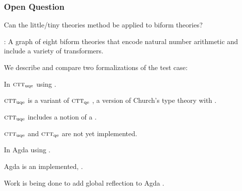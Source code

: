 \documentclass[t,12pt,numbers,fleqn]{beamer}
\newcommand{\churchqe}{$\mbox{\sc ctt}_{\rm qe}$}
\newcommand{\churchuqe}{$\mbox{\sc ctt}_{\rm uqe}$}
\begin{document}

\begin{frame}
\frametitle{Open Question}
\bi

  \item Can the little/tiny theories method be applied to biform
    theories?

  \item {}: A graph of eight biform theories that encode
    natural number arithmetic and include a variety of transformers.

  \item We describe and compare two formalizations of the test case:

  \be

    \item In {\churchuqe} \bbrown{[Far17]} using .

    \bi

      \item {\churchuqe} is a variant of {\churchqe}
        , a version of Church's type theory
        with .

      \item {\churchuqe} includes a notion of a .

      \item {\churchuqe} and {\churchqe} are not yet implemented.

    \ei

    \item In Agda using .

    \bi

      \item Agda is an implemented, .

      \item Work is being done to add global reflection to Agda \bbrown{[WS12]}.

    \ei

  \ee

\ei
\end{frame}

\end{document}
